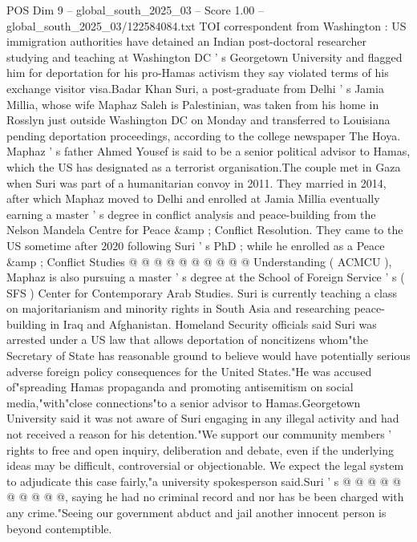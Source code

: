 \begin{textsample}{POS Dim 9 – global\_south\_2025\_03 – Score 1.00 – global\_south\_2025\_03/122584084.txt}  \label{ex:f9_pos_140}
TOI correspondent from Washington : US immigration authorities have detained an Indian post-doctoral researcher studying and teaching at Washington DC ' s Georgetown University and flagged him for deportation for his pro-Hamas activism they say violated terms of his exchange visitor visa.Badar Khan Suri, a post-graduate from Delhi ' s Jamia Millia, whose wife Maphaz Saleh is Palestinian, was taken from his home in Rosslyn just outside Washington DC on Monday and transferred to Louisiana pending deportation proceedings, according to the college newspaper The Hoya.
Maphaz ' s father Ahmed Yousef is said to be a senior political advisor to Hamas, which the US has designated as a terrorist organisation.The couple met in Gaza when Suri was part of a humanitarian convoy in 2011.
They married in 2014, after which Maphaz moved to Delhi and enrolled at Jamia Millia eventually earning a master ' s degree in conflict analysis and peace-building from the Nelson Mandela Centre for Peace \&amp ; Conflict Resolution.
They came to the US sometime after 2020 following Suri ' s PhD ; while he enrolled as a Peace \&amp ; Conflict Studies @ @ @ @ @ @ @ @ @ @ Understanding ( ACMCU ), Maphaz is also pursuing a master ' s degree at the School of Foreign Service ' s ( SFS ) Center for Contemporary Arab Studies.
Suri is currently teaching a class on majoritarianism and minority rights in South Asia and researching peace-building in Iraq and Afghanistan.
Homeland Security officials said Suri was arrested under a US law that allows deportation of noncitizens whom"the Secretary of State has reasonable ground to believe would have potentially serious adverse foreign policy consequences for the United States."He was accused of"spreading Hamas propaganda and promoting antisemitism on social media,"with"close connections"to a senior advisor to Hamas.Georgetown University said it was not aware of Suri engaging in any illegal activity and had not received a reason for his detention."We support our community members ' rights to free and open inquiry, deliberation and debate, even if the underlying ideas may be difficult, controversial or objectionable.
We expect the legal system to adjudicate this case fairly,"a university spokesperson said.Suri ' s @ @ @ @ @ @ @ @ @ @, saying he had no criminal record and nor has be been charged with any crime."Seeing our government abduct and jail another innocent person is beyond contemptible.

\end{textsample}

